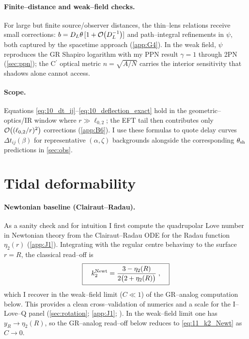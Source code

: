 \documentclass{iopjournal}
\begin{document}
\paragraph{Finite–distance and weak–field checks.}
For large but finite source/observer distances, the thin–lens relations receive small corrections:
\(b=D_L\theta\,[1+\order{D_L^{-1}}]\) and path–integral refinements in \(\psi\), both captured by the
spacetime approach (\cref{app:G4}). In the weak field, \(\psi\) reproduces the GR Shapiro logarithm
with my PPN result \(\gamma=1\) through 2PN (\cref{sec:ppn}); the C$^\prime$ optical metric
\(n=\sqrt{A/N}\) carries the interior sensitivity that shadows alone cannot access.


\paragraph{Scope.}
Equations \eqref{eq:10_dt_ij}–\eqref{eq:10_deflection_exact} hold in the geometric–optics/IR window where $r\gg\ell_{0,2}$; the EFT tail then contributes only $\order{(\ell_{0,2}/r)^2}$ corrections (\cref{app:B6}). I use these formulas to quote delay curves $\Delta t_{ij}(\beta)$ for representative $(\alpha,\zeta)$ backgrounds alongside the corresponding $\theta_{\rm sh}$ predictions in \cref{sec:obs}.

\section{Tidal deformability}\label{sec:tidal}
\paragraph{Newtonian baseline (Clairaut–Radau).}
As a sanity check and for intuition I first compute the quadrupolar Love number in Newtonian theory from the Clairaut–Radau ODE for the Radau function $\eta_2(r)$ (\cref{app:J1}). Integrating with the regular centre behavimy to the surface $r=R$, the classical read–off is
\begin{equation}
\boxed{\quad
k_2^{\rm Newt}
=\frac{3-\eta_2(R)}{2\big(2+\eta_2(R)\big)}\;,
\quad}
\label{eq:11_k2_Newt}
\end{equation}
which I recover in the weak–field limit ($C\ll 1$) of the GR–analog computation below. This provides a clean cross–validation of numerics and a scale for the I–Love–Q panel (\cref{sec:rotation}; \cref{app:J1}; \cite[\S12]{PoissonWill2014}). In the weak–field limit one has $y_R\!\to\!\eta_2(R)$, so the GR–analog read–off below reduces to \eqref{eq:11_k2_Newt} as $C\!\to\!0$.
\end{document}
